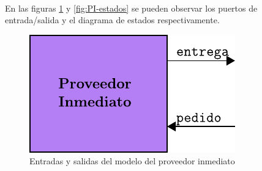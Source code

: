 \documentclass[10pt]{article}
\begin{document}
\\

En las figuras \ref{fig:PI-esquematico} y \ref{fig:PI-estados} se pueden observar los puertos de entrada/salida y el diagrama de estados respectivamente.

\begin{figure}[htbp]
	\centering
	\includegraphics{img/PI-esquematico}
	\caption{Entradas y salidas del modelo del proveedor inmediato}
	\label{fig:PI-esquematico}
\end{figure}
\end{document}
